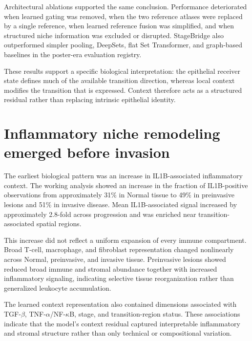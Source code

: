Architectural ablations supported the same conclusion. Performance deteriorated when learned gating was removed, when the two reference atlases were replaced by a single reference, when learned reference fusion was simplified, and when structured niche information was excluded or disrupted. StageBridge also outperformed simpler pooling, DeepSets, flat Set Transformer, and graph-based baselines in the poster-era evaluation registry.

These results support a specific biological interpretation: the epithelial receiver state defines much of the available transition direction, whereas local context modifies the transition that is expressed. Context therefore acts as a structured residual rather than replacing intrinsic epithelial identity.


\section{Inflammatory niche remodeling emerged before invasion}

The earliest biological pattern was an increase in IL1B-associated inflammatory context. The working analysis showed an increase in the fraction of IL1B-positive observations from approximately 31\% in Normal tissue to 49\% in preinvasive lesions and 51\% in invasive disease. Mean IL1B-associated signal increased by approximately 2.8-fold across progression and was enriched near transition-associated spatial regions.

This increase did not reflect a uniform expansion of every immune compartment. Broad T-cell, macrophage, and fibroblast representation changed nonlinearly across Normal, preinvasive, and invasive tissue. Preinvasive lesions showed reduced broad immune and stromal abundance together with increased inflammatory signaling, indicating selective tissue reorganization rather than generalized leukocyte accumulation.

The learned context representation also contained dimensions associated with TGF-$\beta$, TNF-$\alpha$/NF-$\kappa$B, stage, and transition-region status. These associations indicate that the model's context residual captured interpretable inflammatory and stromal structure rather than only technical or compositional variation.


